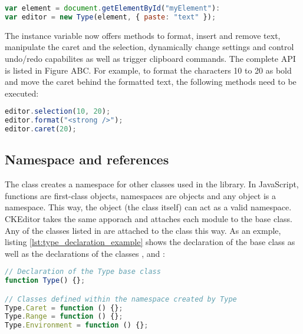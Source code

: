 \begin{lstlisting}[language=JavaScript, caption=Type instantiation, label=lst:type_instantiation]
var element = document.getElementById("myElement"):
var editor = new Type(element, { paste: "text" });
\end{lstlisting}

The  instance variable now offers methods to format, insert and remove text, manipulate the caret and the selection, dynamically change settings and control undo/redo capabilites as well as trigger clipboard commands. The complete API is listed in Figure ABC. For example, to format the characters 10 to 20 as bold and move the caret behind the formatted text, the following methods need to be executed:

\begin{lstlisting}[language=JavaScript, caption=Example commands to format text, label=lst:type_format_example]
editor.selection(10, 20);
editor.format("<strong />");
editor.caret(20);
\end{lstlisting}

\subsection{Namespace and references} 

The  class creates a namespace for other classes used in the library. In JavaScript, functions are first-class objects, namespaces are objects and any object is a namespace. This way, the   object (the class itself) can act as a valid namespace. CKEditor takes the same apporach and attaches each module to the  base class. Any of the classes listed in  are attached to the  class this way. As an exmple, listing \ref{lst:type_declaration_example} shows the declaration of the  base class as well as the declarations of the classes ,  and :

\begin{lstlisting}[language=JavaScript, caption={Declaration of Caret, Range and Environment classes}, label=lst:type_declaration_example]
// Declaration of the Type base class
function Type() {};

// Classes defined within the namespace created by Type
Type.Caret = function () {};
Type.Range = function () {};
Type.Environment = function () {};
\end{lstlisting}

